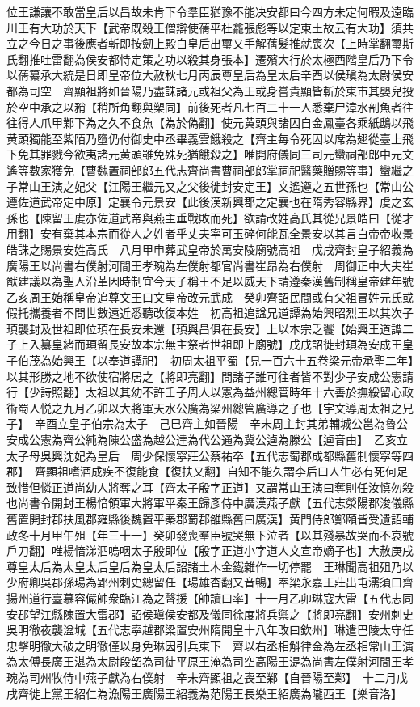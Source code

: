 位王謙讓不敢當皇后以昌故未肯下令羣臣猶豫不能决安都曰今四方未定何暇及遠臨川王有大功於天下【武帝既殺王僧辯使蒨平杜龕張彪等以定東土故云有大功】須共立之今日之事後應者斬即按劒上殿白皇后出璽又手解蒨髮推就喪次【上時掌翻璽斯氏翻推吐雷翻為侯安都恃定策之功以殺其身張本】遷殯大行於太極西階皇后乃下令以蒨纂承大統是日即皇帝位大赦秋七月丙辰尊皇后為皇太后辛酉以侯瑱為太尉侯安都為司空　齊顯祖將如晉陽乃盡誅諸元或祖父為王或身嘗貴顯皆斬於東市其嬰兒投於空中承之以矟【稍所角翻與槊同】前後死者凡七百二十一人悉棄尸漳水剖魚者往往得人爪甲鄴下為之久不食魚【為於偽翻】使元黄頭與諸囚自金鳳臺各乘紙鴟以飛黄頭獨能至紫陌乃墮仍付御史中丞畢義雲餓殺之【齊主每令死囚以席為翅從臺上飛下免其罪戮今欲夷諸元黄頭雖免殊死猶餓殺之】唯開府儀同三司元蠻祠部郎中元文遙等數家獲免【曹魏置祠部郎五代志齊尚書曹祠部郎掌祠祀醫藥贈賜等事】蠻繼之子常山王演之妃父【江陽王繼元又之父後徙封安定王】文遙遵之五世孫也【常山公遵佐道武帝定中原】定襄令元景安【此後漢新興郡之定襄也在隋秀容縣界】䖍之玄孫也【陳留王䖍亦佐道武帝與燕主垂戰敗而死】欲請改姓高氏其從兄景皓曰【從才用翻】安有棄其本宗而從人之姓者乎丈夫寜可玉碎何能瓦全景安以其言白帝帝收景皓誅之賜景安姓高氏　八月甲申葬武皇帝於萬安陵廟號高祖　戊戌齊封皇子紹義為廣陽王以尚書右僕射河間王孝琬為左僕射都官尚書崔昂為右僕射　周御正中大夫崔猷建議以為聖人沿革因時制宜今天子稱王不足以威天下請遵秦漢舊制稱皇帝建年號乙亥周王始稱皇帝追尊文王曰文皇帝改元武成　癸卯齊詔民間或有父祖冒姓元氏或假托攜養者不問世數遠近悉聽改復本姓　初高祖追諡兄道譚為始興昭烈王以其次子頊襲封及世祖即位頊在長安未還【頊與昌俱在長安】上以本宗乏饗【始興王道譚二子上入纂皇緒而頊留長安故本宗無主祭者世祖即上廟號】戊戌詔徙封頊為安成王皇子伯茂為始興王【以奉道譚祀】　初周太祖平蜀【見一百六十五卷梁元帝承聖二年】以其形勝之地不欲使宿將居之【將即亮翻】問諸子誰可往者皆不對少子安成公憲請行【少詩照翻】太祖以其幼不許壬子周人以憲為益州總管時年十六善於撫綏留心政術蜀人悦之九月乙卯以大將軍天水公廣為梁州總管廣導之子也【宇文導周太祖之兄子】　辛酉立皇子伯宗為太子　己巳齊主如晉陽　辛未周主封其弟輔城公邕為魯公安成公憲為齊公純為陳公盛為越公達為代公通為冀公逌為滕公【逌音由】　乙亥立太子母吳興沈妃為皇后　周少保懷寜莊公蔡祐卒【五代志蜀郡成都縣舊制懷寜等四郡】　齊顯祖嗜酒成疾不復能食【復扶又翻】自知不能久謂李后曰人生必有死何足致惜但憐正道尚幼人將奪之耳【齊太子殷字正道】又謂常山王演曰奪則任汝慎勿殺也尚書令開封王楊愔領軍大將軍平秦王歸彥侍中廣漢燕子獻【五代志滎陽郡浚儀縣舊置開封郡扶風郡雍縣後魏置平秦郡蜀郡雒縣舊曰廣漢】黄門侍郎鄭頤皆受遺詔輔政冬十月甲午殂【年三十一】癸卯發喪羣臣號哭無下泣者【以其殘暴故哭而不哀號戶刀翻】唯楊愔涕泗嗚咽太子殷即位【殷字正道小字道人文宣帝嫡子也】大赦庚戌尊皇太后為太皇太后皇后為皇太后詔諸土木金鐵雜作一切停罷　王琳聞高祖殂乃以少府卿吳郡孫瑒為郢州刺史總留任【瑒雄杏翻又音暢】奉梁永嘉王莊出屯濡須口齊揚州道行臺慕容儼帥衆臨江為之聲援【帥讀曰率】十一月乙卯琳寇大雷【五代志同安郡望江縣陳置大雷郡】詔侯瑱侯安都及儀同徐度將兵禦之【將即亮翻】安州刺史吳明徹夜襲湓城【五代志寜越郡梁置安州隋開皇十八年改曰欽州】琳遣巴陵太守任忠擊明徹大破之明徹僅以身免琳因引兵東下　齊以右丞相斛律金為左丞相常山王演為太傅長廣王湛為太尉段韶為司徒平原王淹為司空高陽王湜為尚書左僕射河間王孝琬為司州牧侍中燕子獻為右僕射　辛未齊顯祖之喪至鄴【自晉陽至鄴】　十二月戊戌齊徙上黨王紹仁為漁陽王廣陽王紹義為范陽王長樂王紹廣為隴西王【樂音洛】

